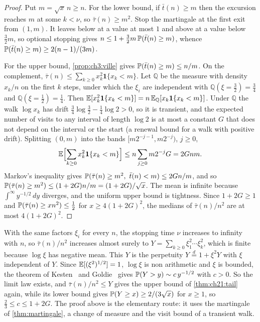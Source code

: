 \begin{proof}
Put $m=\sqrt x\,n\ge n$. For the lower bound, if $\bar t(n)\ge m$ then the excursion reaches $m$ at some $k<\nu$, so $\bar\tau(n)\ge m^2$. Stop the martingale at the first exit from $(1,m)$. It leaves below at a value at most $1$ and above at a value below $\tfrac32m$, so optional stopping gives $n\le1+\tfrac32m\,\mathbb{P}(\bar t(n)\ge m)$, whence $\mathbb{P}(\bar t(n)\ge m)\ge2(n-1)/(3m)$.

For the upper bound, \cref{prop:ch3:ville} gives $\mathbb{P}(\bar t(n)\ge m)\le n/m$. On the complement, $\bar\tau(n)\le\sum_{k\ge0}x_k^2\mathbf 1\{x_k<m\}$. Let $\mathbb Q$ be the measure with density $x_k/n$ on the first $k$ steps, under which the $\xi_i$ are independent with $\mathbb Q(\xi=\tfrac32)=\tfrac34$ and $\mathbb Q(\xi=\tfrac12)=\tfrac14$. Then $\mathbb{E}[x_k^2\mathbf 1\{x_k<m\}]=n\,\mathbb{E}_{\mathbb Q}[x_k\mathbf 1\{x_k<m\}]$. Under $\mathbb Q$ the walk $\log x_k$ has drift $\tfrac34\log\tfrac32-\tfrac14\log2>0$, so it is transient, and the expected number of visits to any interval of length $\log2$ is at most a constant $G$ that does not depend on the interval or the start (a renewal bound for a walk with positive drift). Splitting $(0,m)$ into the bands $[m2^{-j-1},m2^{-j})$, $j\ge0$,
\[
\mathbb{E}\Bigl[\sum_{k\ge0}x_k^2\mathbf 1\{x_k<m\}\Bigr]\le n\sum_{j\ge0}m2^{-j}G=2Gnm .
\]
Markov's inequality gives $\Prob(\bar\tau(n)\ge m^2,\ \bar t(n)<m)\le2Gn/m$, and so $\mathbb{P}(\bar\tau(n)\ge m^2)\le(1+2G)n/m=(1+2G)/\sqrt x$. The mean is infinite because $\int^\infty y^{-1/2}\,dy$ diverges, and the uniform upper bound is tightness. Since $1+2G\ge1$ and $\mathbb{P}(\bar\tau(n)\ge xn^2)\le\tfrac12$ for $x\ge4(1+2G)^2$, the medians of $\bar\tau(n)/n^2$ are at most $4(1+2G)^2$.
\end{proof}

\begin{remark}\label{rem:ch21:perpetuity}
With the same factors $\xi_i$ for every $n$, the stopping time $\nu$ increases to infinity with $n$, so $\bar\tau(n)/n^2$ increases almost surely to $Y=\sum_{k\ge0}\xi_1^2\cdots\xi_k^2$, which is finite because $\log\xi$ has negative mean. This $Y$ is the perpetuity $Y\stackrel{d}{=}1+\xi^2Y$ with $\xi$ independent of $Y$. Since $\mathbb{E}[(\xi^2)^{1/2}]=1$, $\log\xi$ is non arithmetic and $\xi$ is bounded, the theorem of Kesten~\cite{kesten1973} and Goldie~\cite{goldie1991} gives $\mathbb{P}(Y>y)\sim c\,y^{-1/2}$ with $c>0$. So the limit law exists, and $\bar\tau(n)/n^2\le Y$ gives the upper bound of \cref{thm:ch21:tail} again, while its lower bound gives $\mathbb{P}(Y\ge x)\ge2/(3\sqrt x)$ for $x\ge1$, so $\tfrac23\le c\le1+2G$. The proof above is the elementary route: it uses the martingale of \cref{thm:martingale}, a change of measure and the visit bound of a transient walk.
\end{remark}

